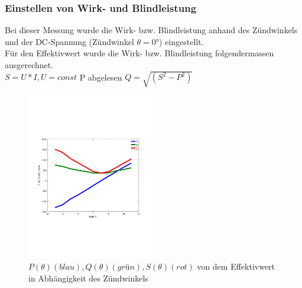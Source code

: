 \subsubsection{Einstellen von Wirk- und Blindleistung}
Bei dieser Messung wurde die Wirk- bzw. Blindleistung anhand des Zündwinkels und der DC-Spannung (Zündwinkel $\theta = 0°$) eingestellt. \\

Für den Effektivwert wurde die Wirk- bzw. Blindleistung folgendermassen ausgerechnet. \\
$S = U*I, U=const$
P abgelesen
$Q = \sqrt{(S^2 - P^2)}$
\begin{figure}[!ht]
  \begin{center}
  \includegraphics[width=0.5\textwidth, trim={1cm 6.5cm 2cm 7cm},clip]{pic/6_1_grundfrequenztaktung/6_1_2_einst_wirk_und_blindleistung/P_Q_S.pdf}
  \caption{$P(\theta) (blau), Q(\theta) (grün), S(\theta) (rot)$ von dem Effektivwert in Abhängigkeit des Zündwinkels}
  \label{fig:6_1_2_0}
  \end{center}
\end{figure}


